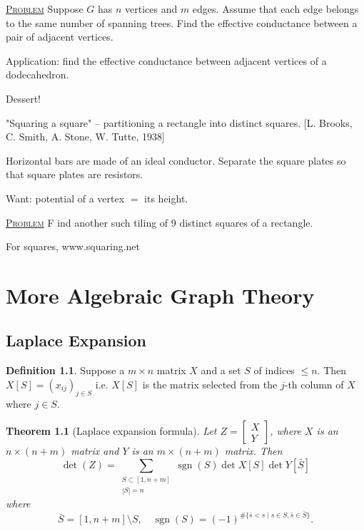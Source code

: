 \documentclass{report}
\def \sgn {\operatorname{sgn}}
\newcommand{\fancyem}[1]{\underline{\textsc{#1}}}
\newtheorem{theorem}{Theorem}[section]
\theoremstyle{definition}
\newtheorem{definition}{Definition}[section]
\theoremstyle{remark}
\numberwithin{equation}{section}
\begin{document}
\fancyem{Problem} Suppose $G$ has $n$ vertices and $m$ edges. Assume that each edge belongs to the same number of spanning trees. Find the effective conductance between a pair of adjacent vertices.

Application: find the effective conductance between adjacent vertices of a dodecahedron.

Dessert!

"Squaring a square" -- partitioning a rectangle into distinct squares. [L. Brooks, C. Smith, A. Stone, W. Tutte, 1938]

Horizontal bars are made of an ideal conductor. Separate the square plates so that square plates are resistors.

Want: potential of a vertex $=$ its height.

\fancyem{Problem} F
ind another such tiling of 9 distinct squares of a rectangle.

For squares, www.squaring.net

\chapter{More Algebraic Graph Theory}

\section{Laplace Expansion}
\begin{definition}
    Suppose a $m \times n$ matrix $X$ and a set $S$ of indices $\leq n$. Then $X[S] = (x_{ij})_{j \in S}$ i.e. $X[S]$ is the matrix selected from the $j$-th column of $X$ where $j \in S$.
\end{definition}

\begin{theorem}[Laplace expansion formula]
    Let $Z = \begin{bmatrix}
        X \\
        Y
    \end{bmatrix}$, where $X$ is an $n \times (n + m)$ matrix and $Y$ is an $m \times (n + m)$ matrix. Then \[\det (Z) = \sum_{\substack{S \subset [1, n + m] \\ |S| = n}} \sgn(S) \det X[S]\det Y[\bar{S}]\]
    where \[\bar{S} = [1, n + m] \setminus S, \quad \sgn(S) = (-1)^{\#\{\bar{s} < s \mid s \in S, \bar{s} \in \bar{S}\}}.\]
\end{theorem}
\end{document}
